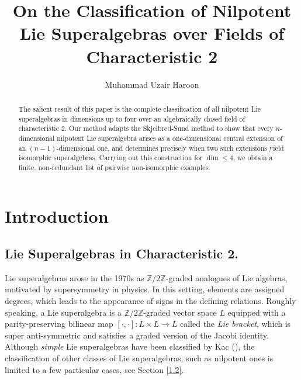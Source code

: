 \documentclass[12pt]{amsart}
\newcommand{\Z}{\mathbb{Z}}
\begin{document}
\title{On the Classification of Nilpotent Lie Superalgebras over Fields of Characteristic 2}
\author{Muhammad Uzair Haroon}
\begin{abstract}
The salient result of this paper is the  complete classification of all  nilpotent Lie superalgebras in dimensions up to four over an algebraically closed field of characteristic 2. Our method adapts the Skjelbred-Sund method to show that every $n$-dimensional nilpotent Lie superalgebra arises as a one-dimensional central extension of an $(n-1)$-dimensional one, and  determines precisely when two such extensions yield isomorphic superalgebras. Carrying out this construction for $\dim\le4$, we obtain a finite, non‐redundant list of pairwise non-isomorphic examples.
\end{abstract}
\maketitle


\thispagestyle{empty}
\setcounter{tocdepth}{2}
\tableofcontents

\section{Introduction} \label{Introduction}
\vspace{0.25 em}

\subsection{Lie Superalgebras in Characteristic 2.}\label{1} Lie superalgebras arose in the 1970s as $\mathbb{Z}/2\mathbb{Z}$-graded analogues of Lie algebras, motivated by supersymmetry in physics. In this setting, elements are assigned degrees, which leads to the appearance of signs in the defining relations. Roughly speaking, a Lie superalgebra is a $\Z/2\Z$-graded vector space $L$ equipped with a parity-preserving bilinear map $[\cdot,\cdot]:L\times L\to L$ called the \textit{Lie bracket}, which is super anti-symmetric and satisfies a graded version of the Jacobi identity. Although \textit{simple} Lie superalgebras have been classified by Kac (\cite{K}), the classification of other classes of Lie superalgebras, such as nilpotent ones is limited to a few particular cases, see Section \ref{1.2}.
\end{document}
